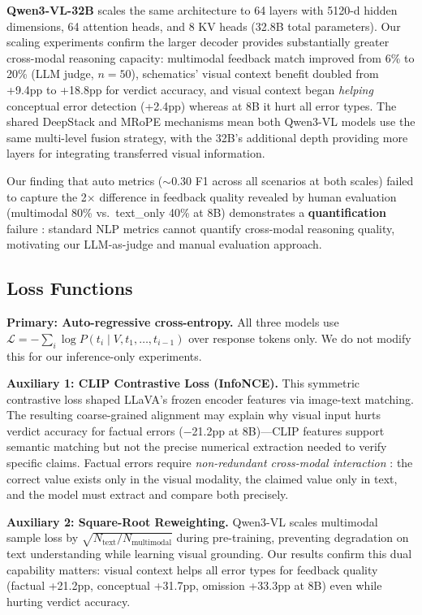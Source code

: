 \documentclass{article} %
\begin{document}
\textbf{Qwen3-VL-32B} scales the same architecture to 64 layers with 5120-d hidden dimensions, 64 attention heads, and 8 KV heads (32.8B total parameters). Our scaling experiments confirm the larger decoder provides substantially greater cross-modal reasoning capacity: multimodal feedback match improved from 6\% to 20\% (LLM judge, $n{=}50$), schematics' visual context benefit doubled from +9.4pp to +18.8pp for verdict accuracy, and visual context began \emph{helping} conceptual error detection (+2.4pp) whereas at 8B it hurt all error types. The shared DeepStack and MRoPE mechanisms mean both Qwen3-VL models use the same multi-level fusion strategy, with the 32B's additional depth providing more layers for integrating transferred visual information.

Our finding that auto metrics (${\sim}$0.30 F1 across all scenarios at both scales) failed to capture the 2$\times$ difference in feedback quality revealed by human evaluation (multimodal 80\% vs.\ text\_only 40\% at 8B) demonstrates a \textbf{quantification} failure \citep{Liang-foundations-2024}: standard NLP metrics cannot quantify cross-modal reasoning quality, motivating our LLM-as-judge and manual evaluation approach.

\subsection{ Loss Functions}

\textbf{Primary: Auto-regressive cross-entropy.} All three models use $\mathcal{L} = -\sum_i \log P(t_i \mid V, t_1, \ldots, t_{i-1})$ over response tokens only. We do not modify this for our inference-only experiments.

\textbf{Auxiliary 1: CLIP Contrastive Loss (InfoNCE).} This symmetric contrastive loss shaped LLaVA's frozen encoder features via image-text matching. The resulting coarse-grained alignment may explain why visual input hurts verdict accuracy for factual errors ($-$21.2pp at 8B)---CLIP features support semantic matching but not the precise numerical extraction needed to verify specific claims. Factual errors require \emph{non-redundant cross-modal interaction} \citep{Liang-foundations-2024}: the correct value exists only in the visual modality, the claimed value only in text, and the model must extract and compare both precisely.

\textbf{Auxiliary 2: Square-Root Reweighting.} Qwen3-VL scales multimodal sample loss by $\sqrt{N_\text{text}/N_\text{multimodal}}$ during pre-training, preventing degradation on text understanding while learning visual grounding. Our results confirm this dual capability matters: visual context helps all error types for feedback quality (factual +21.2pp, conceptual +31.7pp, omission +33.3pp at 8B) even while hurting verdict accuracy.
\end{document}
